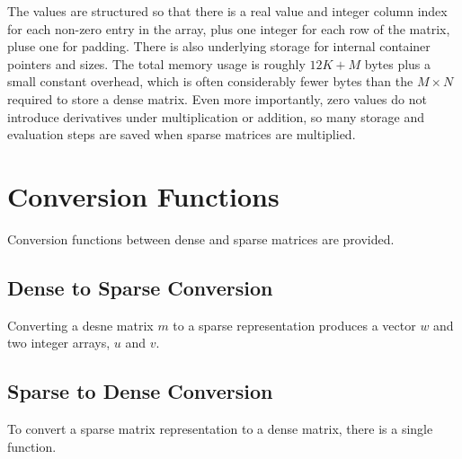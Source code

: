 The values are structured so that there is a real value and integer
column index for each non-zero entry in the array, plus one integer
for each row of the matrix, pluse one for padding.  There is also
underlying storage for internal container pointers and sizes.  The
total memory usage is roughly $12 K + M$ bytes plus a small constant
overhead, which is often considerably fewer bytes than the $M \times N$
required to store a dense matrix.  Even more importantly, zero
values do not introduce derivatives under multiplication or addition,
so many storage and evaluation steps are saved when sparse matrices
are multiplied.

\section{Conversion Functions}

Conversion functions between dense and sparse matrices are provided.

\subsection{Dense to Sparse Conversion}

Converting a desne matrix $m$ to a sparse representation produces a
vector $w$ and two integer arrays, $u$ and $v$.

\begin{description}
%
%
%
%
\end{description}
%

\subsection{Sparse to Dense Conversion}

To convert a sparse matrix representation to a dense matrix, there is
a single function.
%
\begin{description}
\end{description}

